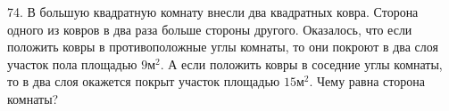 74. В большую квадратную комнату внесли два квадратных ковра. Сторона одного из ковров в два раза больше стороны другого. Оказалось, что если положить ковры в противоположные углы комнаты, то они покроют в два слоя участок пола площадью $9\text{м}^2.$ А если положить ковры в соседние углы комнаты, то в два слоя окажется покрыт участок площадью $15\text{м}^2.$ Чему равна сторона комнаты?\\
